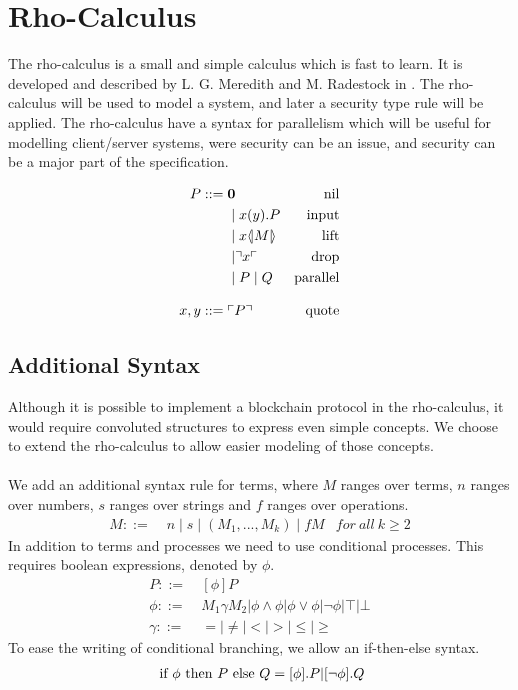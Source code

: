 \section{Rho-Calculus}
The rho-calculus is a small and simple calculus which is fast to learn.
It is developed and described by L. G. Meredith and M. Radestock in \citep{Meredith2005}.
The rho-calculus will be used to model a system, and later a security type rule will be applied.
The rho-calculus have a syntax for parallelism which will be useful for modelling client/server systems, were security can be an issue, and security can be a major part of the specification. 

\begin{align*}
    P  ::= \; &  \mathbf{0} & \text{nil} \\
      & \mid x(y).P & \text{input} \\
      & \mid x \langle \! | M | \! \rangle & \text{lift} \\
      & \mid \urcorner x \ulcorner & \text{drop} \\
      & \mid P \mid Q & \text{parallel} \\[3mm]
    x,y ::= \; & \ulcorner P \urcorner & \text{quote}\\
\end{align*}



\subsection{Additional Syntax}
Although it is possible to implement a blockchain protocol in the rho-calculus, it would require convoluted structures to express even simple concepts.
We choose to extend the rho-calculus to allow easier modeling of those concepts.\\
\\
We add an additional syntax rule for terms, where $M$ ranges over terms, $n$ ranges over numbers, $s$ ranges over strings and $f$ ranges over operations.
\begin{align*}
M::=\; & n \mid s \mid (M_1,...,M_k) \mid fM &for\ all\ k \geq 2
\end{align*}
In addition to terms and processes we need to use conditional processes. This requires boolean expressions, denoted by \ensuremath{\phi}.
\begin{align*}
P::=& \ [\phi] P\\
\phi ::=& \ M_1\gamma M_2|\phi\land\phi|\phi\lor\phi|\neg\phi|\top|\bot\\
\gamma ::=& \ =|\neq|<|>|\leq|\geq
\end{align*}
To ease the writing of conditional branching, we allow an if-then-else syntax.
\begin{align*}
	\text{ if }\phi\text{ then }P\text{ else }Q = [\phi].P | [\neg \phi].Q
\end{align*}

